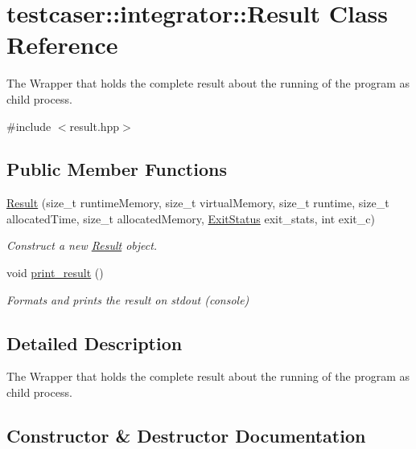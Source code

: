 \hypertarget{classtestcaser_1_1integrator_1_1Result}{}\section{testcaser\+:\+:integrator\+:\+:Result Class Reference}
\label{classtestcaser_1_1integrator_1_1Result}


The Wrapper that holds the complete result about the running of the program as child process.  




{\ttfamily \#include $<$result.\+hpp$>$}

\subsection*{Public Member Functions}
\begin{DoxyCompactItemize}
\item 
\mbox{\hyperlink{classtestcaser_1_1integrator_1_1Result_a74713e8425d62a6ea2e349b8255e3a95}{Result}} (size\+\_\+t runtime\+Memory, size\+\_\+t virtual\+Memory, size\+\_\+t runtime, size\+\_\+t allocated\+Time, size\+\_\+t allocated\+Memory, \mbox{\hyperlink{namespacetestcaser_1_1integrator_a68fcfdfd3f063954e9fd1a94f4b4f755}{Exit\+Status}} exit\+\_\+stats, int exit\+\_\+c)
\begin{DoxyCompactList}\small\item\em Construct a new \mbox{\hyperlink{classtestcaser_1_1integrator_1_1Result}{Result}} object. \end{DoxyCompactList}\item 
void \mbox{\hyperlink{classtestcaser_1_1integrator_1_1Result_a941ae470ca06388faff84e0a3bf3e5e0}{print\+\_\+result}} ()
\begin{DoxyCompactList}\small\item\em Formats and prints the result on stdout (console) \end{DoxyCompactList}\end{DoxyCompactItemize}


\subsection{Detailed Description}
The Wrapper that holds the complete result about the running of the program as child process. 



\subsection{Constructor \& Destructor Documentation}
\mbox{\label{classtestcaser_1_1integrator_1_1Result_a74713e8425d62a6ea2e349b8255e3a95}} 
